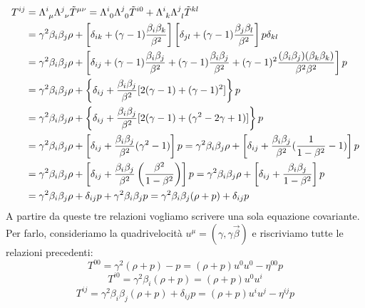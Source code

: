 \begin{equation}
\begin{aligned}
   T^{ij}&=\Lambda\indices{^i_\mu}\Lambda\indices{^j_\nu}\Tilde{T}\indices{^{\mu\nu}}=\Lambda\indices{^i_0}\Lambda\indices{^j_0}\Tilde{T}\indices{^{i0}}+\Lambda\indices{^i_k}\Lambda\indices{^j_l}\Tilde{T}\indices{^{kl}}\\
   &=\gamma^2\beta_i\beta_j\rho+\left[\delta_{ik}+(\gamma-1)\dfrac{\beta_i\beta_k}{\beta^2}\right]\left[\delta_{jl}+(\gamma-1)\dfrac{\beta_j\beta_l}{\beta^2}\right]p\delta_{kl}\\
   &=\gamma^2\beta_i\beta_j\rho+\left[\delta_{ij}+(\gamma-1)\dfrac{\beta_i\beta_j}{\beta^2}+(\gamma-1)\dfrac{\beta_i\beta_j}{\beta^2}+(\gamma-1)^2\dfrac{(\beta_i\beta_j)(\beta_k\beta_k)}{\beta^2\beta^2}\right]p\\
   &=\gamma^2\beta_i\beta_j\rho+\left\{\delta_{ij}+\dfrac{\beta_i\beta_j}{\beta^2}[2(\gamma-1)+(\gamma-1)^2]\right\}p\\
   &=\gamma^2\beta_i\beta_j\rho+\left\{\delta_{ij}+\dfrac{\beta_i\beta_j}{\beta^2}[2(\gamma-1)+(\gamma^2-2\gamma+1)]\right\}p\\
   &=\gamma^2\beta_i\beta_j\rho+\left[\delta_{ij}+\dfrac{\beta_i\beta_j}{\beta^2}(\gamma^2-1)\right]p=\gamma^2\beta_i\beta_j\rho+\left[\delta_{ij}+\dfrac{\beta_i\beta_j}{\beta^2}(\dfrac{1}{1-\beta^2}-1)\right]p\\
   &=\gamma^2\beta_i\beta_j\rho+\left[\delta_{ij}+\dfrac{\beta_i\beta_j}{\beta^2}\left(\dfrac{\beta^2}{1-\beta^2}\right)\right]p=\gamma^2\beta_i\beta_j\rho+\left[\delta_{ij}+\dfrac{\beta_i\beta_j}{1-\beta^2}\right]p\\
   &=\gamma^2\beta_i\beta_j\rho+\delta_{ij}p+\gamma^2\beta_i\beta_jp=\gamma^2\beta_i\beta_j(\rho+p)+\delta_{ij}p
   \end{aligned}
\end{equation}
A partire da queste tre relazioni vogliamo scrivere una sola equazione covariante. Per farlo, consideriamo la quadrivelocità $u^\mu=(\gamma,\gamma\Vec{\beta})$ e riscriviamo tutte le relazioni precedenti:
\begin{equation}
     T^{00}=\gamma^2(\rho+p)-p=(\rho+p)u^0u^0-\eta^{00}p
\end{equation}
\begin{equation}
     T^{i0}=\gamma^2\beta_i(\rho+p)=(\rho+p)u^0u^i
\end{equation}
\begin{equation}
    T^{ij}=\gamma^2\beta_i\beta_j(\rho+p)+\delta_{ij}p=(\rho+p)u^iu^j-\eta^{ij}p
\end{equation}
